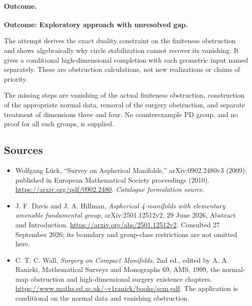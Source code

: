 \documentclass[11pt,a4paper]{article}
\numberwithin{equation}{section}
\begin{document}
\paragraph{Outcome.}
\textbf{Outcome: Exploratory approach with unresolved gap.}

The attempt derives the exact duality constraint on the finiteness
obstruction and shows algebraically why circle stabilization cannot
recover its vanishing. It gives a conditional high-dimensional
completion with each geometric input named separately. These are
obstruction calculations, not new realizations or claims of priority.

The missing steps are vanishing of the actual finiteness obstruction,
construction of the appropriate normal data, removal of the surgery
obstruction, and separate treatment of dimensions three and four.
No counterexample PD group, and no proof for all such groups, is supplied.
\subsection{Sources}
\begin{itemize}\raggedright
\item[\textnormal{[S1]}]\hypertarget{source:221:1}{} Wolfgang Lück, “Survey on Aspherical Manifolds,” arXiv:0902.2480v3 (2009); published in European Mathematical Society proceedings (2010).
\url{https://arxiv.org/pdf/0902.2480}.
{\small\textit{Catalogue formulation source.}}
\item[\textnormal{[E1]}]\hypertarget{extra:221:1}{}
J. F. Davis and J. A. Hillman, \emph{Aspherical 4-manifolds with elementary
amenable fundamental group}, arXiv:2501.12512v2, 29 June 2026, Abstract
and Introduction. \url{https://arxiv.org/abs/2501.12512v2}.
Consulted 27 September 2026; its boundary and group-class restrictions
are not omitted here.
\item[\textnormal{[E2]}]\hypertarget{extra:221:2}{}
C. T. C. Wall, \emph{Surgery on Compact Manifolds}, 2nd ed., edited by
A. A. Ranicki, Mathematical Surveys and Monographs 69, AMS, 1999,
the normal-map obstruction and high-dimensional surgery existence
chapters. \url{https://www.maths.ed.ac.uk/~v1ranick/books/scm.pdf}.
The application is conditional on the normal data and vanishing obstruction.
\end{itemize}
\end{document}
